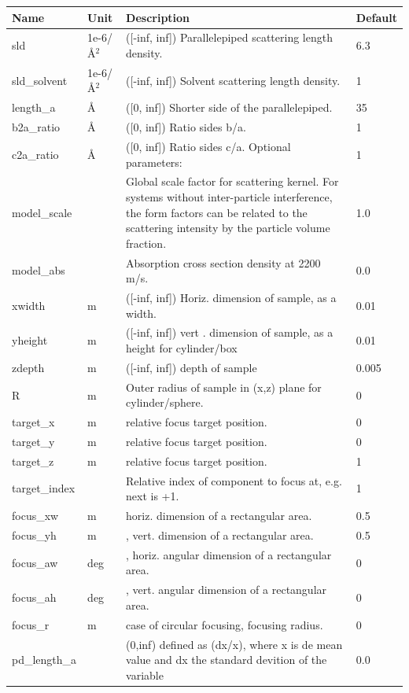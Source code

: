 \begin{longtable}{p{}p{}p{}p{}}
\toprule
\textbf{Name} & \textbf{Unit} & \textbf{Description} & \textbf{Default} \\
\midrule
\endhead
sld & 1e-6/\AA{}$^{2}$ & ([-inf, inf]) Parallelepiped scattering length density. & 6.3 \\
sld\_solvent & 1e-6/\AA{}$^{2}$ & ([-inf, inf]) Solvent scattering length density. & 1 \\
length\_a & \AA{} & ([0, inf]) Shorter side of the parallelepiped. & 35 \\
b2a\_ratio & \AA{} & ([0, inf]) Ratio sides b/a. & 1 \\
c2a\_ratio & \AA{} & ([0, inf]) Ratio sides c/a. Optional parameters: & 1 \\
model\_scale &   & Global scale factor for scattering kernel. For systems without inter-particle interference, the form factors can be related to the scattering intensity by the particle volume fraction. & 1.0 \\
model\_abs &   & Absorption cross section density at 2200 m/s. & 0.0 \\
xwidth & m & ([-inf, inf]) Horiz. dimension of sample, as a width. & 0.01 \\
yheight & m & ([-inf, inf]) vert . dimension of sample, as a height for cylinder/box & 0.01 \\
zdepth & m & ([-inf, inf]) depth of sample & 0.005 \\
R & m & Outer radius of sample in (x,z) plane for cylinder/sphere. & 0 \\
target\_x & m & relative focus target position. & 0 \\
target\_y & m & relative focus target position. & 0 \\
target\_z & m & relative focus target position. & 1 \\
target\_index &   & Relative index of component to focus at, e.g. next is +1. & 1 \\
focus\_xw & m & horiz. dimension of a rectangular area. & 0.5 \\
focus\_yh & m & , vert. dimension of a rectangular area. & 0.5 \\
focus\_aw & deg & , horiz. angular dimension of a rectangular area. & 0 \\
focus\_ah & deg & , vert. angular dimension of a rectangular area. & 0 \\
focus\_r & m & case of circular focusing, focusing radius. & 0 \\
pd\_length\_a &  & (0,inf) defined as (dx/x), where x is de mean value and dx the standard devition of the variable & 0.0 \\
\bottomrule
\end{longtable}


